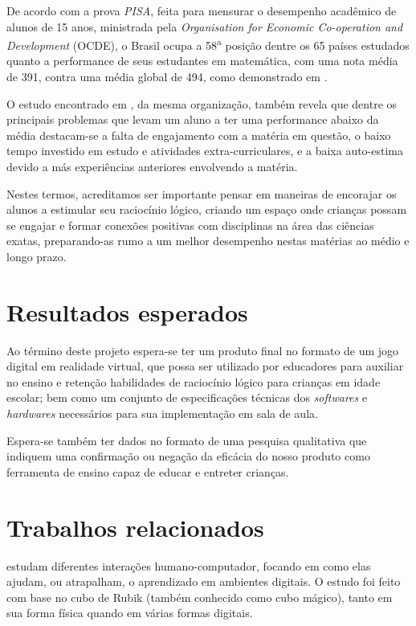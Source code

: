 De acordo com a prova \textit{PISA}, feita para mensurar o 
desempenho acadêmico de alunos de 15 anos, ministrada pela 
\textit{Organisation for Economic Co-operation and Development} 
(OCDE), o Brasil ocupa a 58\textsuperscript{a} posição dentre 
os 65 países estudados quanto a performance de seus estudantes 
em matemática, com uma nota média de 391, contra uma média 
global de 494, como demonstrado em \cite{OECD:2012:pisa-brazil}. 

O estudo encontrado em \cite{OECD:2016:low_performing_students}, 
da mesma organização, também revela que dentre os principais 
problemas que levam um aluno a ter uma performance abaixo da média 
destacam-se a falta de engajamento com a matéria em questão, 
o baixo tempo investido em estudo e atividades extra-curriculares, 
e a baixa auto-estima devido a más experiências anteriores 
envolvendo a matéria.

Nestes termos, acreditamos ser importante pensar em maneiras 
de encorajar os alunos a estimular seu raciocínio lógico, 
criando um espaço onde crianças possam se engajar e formar 
conexões positivas com disciplinas na área das ciências 
exatas, preparando-as rumo a um melhor desempenho nestas 
matérias ao médio e longo prazo.

\section{Resultados esperados}\label{sec-resultados-esperados}

Ao término deste projeto espera-se ter um produto final no 
formato de um jogo digital em realidade virtual, que possa 
ser utilizado por educadores para auxiliar no ensino e retenção 
habilidades de raciocínio lógico para crianças em idade escolar; 
bem como um conjunto de especificações técnicas dos 
\textit{softwares} e \textit{hardwares} necessários para sua 
implementação em sala de aula.

Espera-se também ter dados no formato de uma pesquisa 
qualitativa que indiquem uma confirmação ou negação da 
eficácia do nosso produto como ferramenta de ensino capaz 
de educar e entreter crianças.

\section{Trabalhos relacionados}\label{sec-trabalhos-relacionados}

\cite{Tabuti:2010:analise} estudam diferentes interações humano-computador, 
focando em como elas ajudam, ou atrapalham, o aprendizado em ambientes 
digitais. O estudo foi feito com base no cubo de Rubik 
(também conhecido como cubo mágico), tanto em sua forma física 
quando em várias formas digitais.

